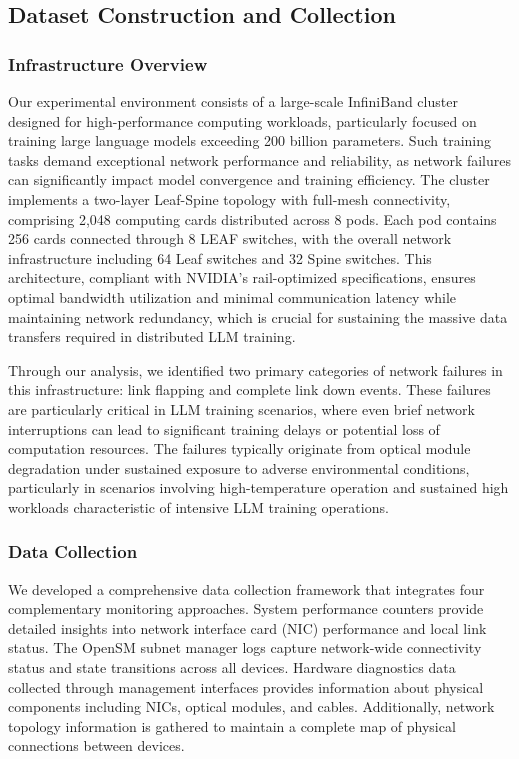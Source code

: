 \documentclass[conference]{IEEEtran}
\begin{document}
\subsection{Dataset Construction and Collection}

\subsubsection{Infrastructure Overview}
Our experimental environment consists of a large-scale InfiniBand cluster designed for high-performance computing workloads, particularly focused on training large language models exceeding 200 billion parameters. Such training tasks demand exceptional network performance and reliability, as network failures can significantly impact model convergence and training efficiency. The cluster implements a two-layer Leaf-Spine topology with full-mesh connectivity, comprising 2,048 computing cards distributed across 8 pods. Each pod contains 256 cards connected through 8 LEAF switches, with the overall network infrastructure including 64 Leaf switches and 32 Spine switches. This architecture, compliant with NVIDIA's rail-optimized specifications, ensures optimal bandwidth utilization and minimal communication latency while maintaining network redundancy, which is crucial for sustaining the massive data transfers required in distributed LLM training.

Through our analysis, we identified two primary categories of network failures in this infrastructure: link flapping and complete link down events. These failures are particularly critical in LLM training scenarios, where even brief network interruptions can lead to significant training delays or potential loss of computation resources. The failures typically originate from optical module degradation under sustained exposure to adverse environmental conditions, particularly in scenarios involving high-temperature operation and sustained high workloads characteristic of intensive LLM training operations. 

\subsubsection{Data Collection}
We developed a comprehensive data collection framework that integrates four complementary monitoring approaches. System performance counters provide detailed insights into network interface card (NIC) performance and local link status. The OpenSM subnet manager logs capture network-wide connectivity status and state transitions across all devices. Hardware diagnostics data collected through management interfaces provides information about physical components including NICs, optical modules, and cables. Additionally, network topology information is gathered to maintain a complete map of physical connections between devices. 
\end{document}
